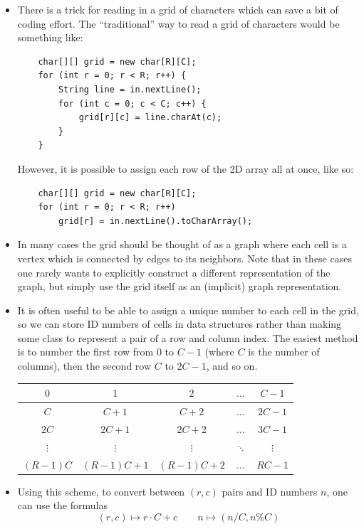 \documentclass[10pt]{book}
\begin{document}
\begin{itemize}
\item There is a trick for reading in a grid of characters which can
  save a bit of coding effort.  The ``traditional'' way to read a grid of
  characters would be something like:
  \begin{verbatim}
    char[][] grid = new char[R][C];
    for (int r = 0; r < R; r++) {
        String line = in.nextLine();
        for (int c = 0; c < C; c++) {
            grid[r][c] = line.charAt(c);
        }
    }
  \end{verbatim}
  However, it is possible to assign each row of the 2D array all at
  once, like so:
  \begin{verbatim}
    char[][] grid = new char[R][C];
    for (int r = 0; r < R; r++)
        grid[r] = in.nextLine().toCharArray();
  \end{verbatim}
\item In many cases the grid should be thought of as a graph where
  each cell is a vertex which is connected by edges to its neighbors.
  Note that in these cases one rarely wants to explicitly construct
  a different representation of the graph, but simply use the grid
  itself as an (implicit) graph representation.
\item It is often useful to be able to assign a unique number to each
  cell in the grid, so we can store ID numbers of cells in data
  structures rather than making some class to represent a pair of a
  row and column index.  The easiest method is to number the first row
  from $0$ to $C-1$ (where $C$ is the number of columns), then the
  second row $C$ to $2C-1$, and so on.

  \begin{tabular}{|c|c|c|c|c|}
    \hline
    $0$ & $1$ & $2$ & $\dots$ & $C-1$ \\
    \hline
    $C$ & $C+1$ & $C+2$ & $\dots$ & $2C-1$ \\
    \hline
    $2C$ & $2C+1$ & $2C+2$ & $\dots$ & $3C-1$ \\
    \hline
    $\vdots$ & $\vdots$ & $\vdots$ & $\ddots$ & $\vdots$ \\
    \hline
    $(R-1)C$ & $(R-1)C+1$ & $(R-1)C+2$ & $\dots$ & $RC-1$ \\
    \hline
  \end{tabular}

\item Using this scheme, to convert between $(r,c)$ pairs and ID
  numbers $n$, one can use the formulas
  \[ (r,c) \mapsto r \cdot C + c \qquad n \mapsto (n / C, n \% C) \]


\end{itemize}
\end{document}
